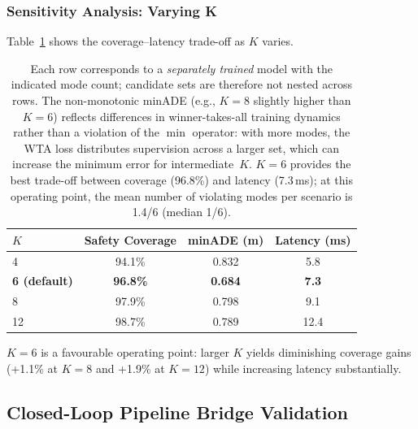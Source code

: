 \subsubsection{Sensitivity Analysis: Varying K}
\label{subsubsec:k_sensitivity}

Table~\ref{tab:k_sensitivity} shows the coverage--latency trade-off as $K$ varies.

\begin{table}[t]
\centering
\caption{Effect of Number of Modes K on Coverage and Efficiency}
\label{tab:k_sensitivity}
\begin{tabular}{lccc}
\toprule
\textbf{$K$} & \textbf{Safety Coverage} & \textbf{minADE (m)} & \textbf{Latency (ms)} \\
\midrule
4 & 94.1\% & 0.832 & 5.8 \\
\textbf{6 (default)} & \textbf{96.8\%} & \textbf{0.684} & \textbf{7.3} \\
8 & 97.9\% & 0.798 & 9.1 \\
12 & 98.7\% & 0.789 & 12.4 \\
\bottomrule
\end{tabular}
\vspace{1mm} \caption*{\footnotesize Each row corresponds to a \emph{separately trained} model with the indicated mode count; candidate sets are therefore not nested across rows.  The non-monotonic minADE (e.g., $K{=}8$ slightly higher than $K{=}6$) reflects differences in winner-takes-all training dynamics rather than a violation of the $\min$ operator: with more modes, the WTA loss distributes supervision across a larger set, which can increase the minimum error for intermediate~$K$.  $K{=}6$ provides the best trade-off between coverage (96.8\%) and latency (7.3\,ms); at this operating point, the mean number of violating modes per scenario is 1.4/6 (median 1/6).}
\end{table}

\noindent
$K{=}6$ is a favourable operating point: larger $K$ yields diminishing coverage gains (+1.1\% at $K{=}8$ and +1.9\% at $K{=}12$) while increasing
latency substantially.

\subsection{Closed-Loop Pipeline Bridge Validation}
\label{subsec:closed_loop}

